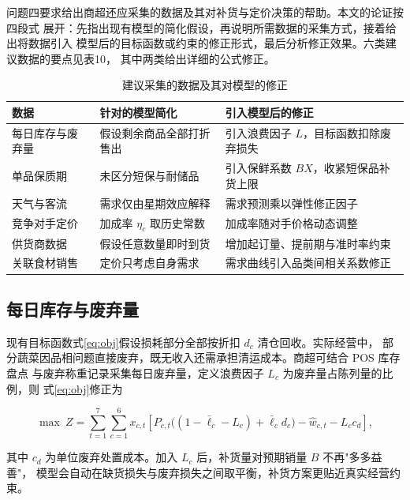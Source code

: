
问题四要求给出商超还应采集的数据及其对补货与定价决策的帮助。本文的论证按四段式
展开：先指出现有模型的简化假设，再说明所需数据的采集方式，接着给出将数据引入
模型后的目标函数或约束的修正形式，最后分析修正效果。六类建议数据的要点见表10，
其中两类给出详细的公式修正。

\begin{table}[H]
\centering
\caption{建议采集的数据及其对模型的修正}
\label{tab:q4data}
\small
\begin{tabular}{p{2.6cm}p{4.2cm}p{4.6cm}}
\toprule
数据 & 针对的模型简化 & 引入模型后的修正 \\
\midrule
每日库存与废弃量 & 假设剩余商品全部打折售出 & 引入浪费因子 $L$，目标函数扣除废弃损失 \\
单品保质期 & 未区分短保与耐储品 & 引入保鲜系数 $BX$，收紧短保品补货上限 \\
天气与客流 & 需求仅由星期效应解释 & 需求预测乘以弹性修正因子 \\
竞争对手定价 & 加成率 $\eta_c$ 取历史常数 & 加成率随对手价格动态调整 \\
供货商数据 & 假设任意数量即时到货 & 增加起订量、提前期与准时率约束 \\
关联食材销售 & 定价只考虑自身需求 & 需求曲线引入品类间相关系数修正 \\
\bottomrule
\end{tabular}
\end{table}

\subsection{每日库存与废弃量}

现有目标函数式\eqref{eq:obj}假设损耗部分全部按折扣 $d_c$ 清仓回收。实际经营中，
部分蔬菜因品相问题直接废弃，既无收入还需承担清运成本。商超可结合 POS 库存盘点
与废弃称重记录采集每日废弃量，定义浪费因子 $L_c$ 为废弃量占陈列量的比例，则
式\eqref{eq:obj}修正为

\begin{equation}
\max\ Z=\sum_{t=1}^{7}\sum_{c=1}^{6}x_{c,t}\left[P_{c,t}\bigl((1-\bar\ell_c-L_c)+\bar\ell_c d_c\bigr)-\hat w_{c,t}-L_c c_d\right],
\label{eq:q4_waste}
\end{equation}

其中 $c_d$ 为单位废弃处置成本。加入 $L_c$ 后，补货量对预期销量 $B$ 不再"多多益善"，
模型会自动在缺货损失与废弃损失之间取平衡，补货方案更贴近真实经营约束。


